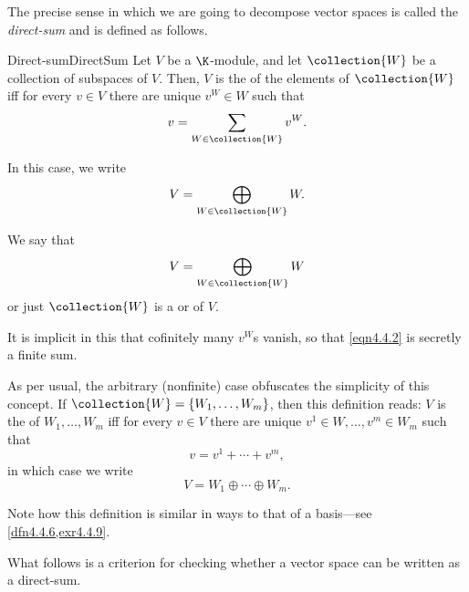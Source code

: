 The precise sense in which we are going to decompose vector spaces is called the \emph{direct-sum} and is defined as follows.
\begin{dfn}{Direct-sum}{DirectSum}
	Let $V$ be a $\K$-module, and let $\collection{W}$ be a collection of subspaces of $V$.  Then, $V$ is the  of the elements of $\collection{W}$ iff for every $v\in V$ there are unique $v^W\in W$ such that
	\begin{equation}\label{eqn4.4.2}
		v=\sum _{W\in \collection{W}}v^W.
	\end{equation}
	\begin{rmk}
		In this case, we write
		\begin{equation}
			V=\bigoplus _{W\in \collection{W}}W.
		\end{equation}
	\end{rmk}
	\begin{rmk}
		We say that
		\begin{equation}
			V=\bigoplus _{W\in \collection{W}}W
		\end{equation}
		or just $\collection{W}$ is a  or  of $V$.
	\end{rmk}
	\begin{rmk}
		It is implicit in this that cofinitely many $v^W$s vanish, so that \eqref{eqn4.4.2} is secretly a finite sum.
	\end{rmk}
	\begin{rmk}
		As per usual, the arbitrary (nonfinite) case obfuscates the simplicity of this concept.  If $\collection{W}=\{ W_1,\ldots ,W_m\}$, then this definition reads:  $V$ is the  of $W_1,\ldots ,W_m$ iff for every $v\in V$ there are unique $v^1\in W,\ldots ,v^m\in W_m$ such that
		\begin{equation}
			v=v^1+\cdots +v^m,
		\end{equation}
		in which case we write
		\begin{equation}
			V=W_1\oplus \cdots \oplus W_m.
		\end{equation}\index[notation]{$W_1\oplus \cdots \oplus W_m$}
	\end{rmk}
	\begin{rmk}
		Note how this definition is similar in ways to that of a basis---see \cref{dfn4.4.6,exr4.4.9}.
	\end{rmk}
\end{dfn}
What follows is a criterion for checking whether a vector space can be written as a direct-sum.

